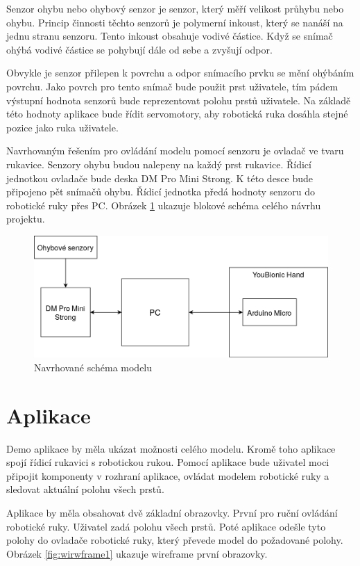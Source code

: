 \documentclass[thesis=B,czech]{FITthesis}[2012/06/26]
\begin{document}
Senzor ohybu nebo ohybový senzor je senzor, který měří velikost průhybu nebo ohybu. Princip činnosti těchto senzorů je polymerní inkoust, který se nanáší na jednu stranu senzoru. Tento inkoust obsahuje vodivé částice. Když se snímač ohýbá vodivé částice se pohybují dále od sebe a zvyšují odpor\cite{flexSens}. 

Obvykle je senzor přilepen k povrchu a odpor snímacího prvku se mění ohýbáním povrchu. Jako povrch pro tento snímač bude použit prst uživatele, tím pádem výstupní hodnota senzorů bude reprezentovat polohu prstů uživatele. Na základě této hodnoty aplikace bude řídit servomotory, aby robotická ruka dosáhla stejné pozice jako ruka uživatele. 


Navrhovaným řešením pro ovládání modelu pomocí senzoru je ovladač ve tvaru rukavice. Senzory ohybu budou nalepeny na každý prst rukavice. Řídicí jednotkou ovladače bude deska DM Pro Mini Strong. K této desce bude připojeno pět snímačů ohybu. Řídicí jednotka předá hodnoty senzoru do robotické ruky přes PC. Obrázek \ref{fig:gloveBlock} ukazuje blokové schéma celého návrhu projektu.

 \begin{figure}[H]
\centering
\includegraphics[scale=0.35]{./image/gloveBlock.png}
\caption{Navrhované schéma modelu}
\label{fig:gloveBlock}
\end{figure}

\section{Aplikace}

Demo aplikace by měla ukázat možnosti celého modelu. Kromě toho aplikace spojí řídicí rukavici s robotickou rukou. Pomocí aplikace bude uživatel moci připojit komponenty v rozhraní aplikace, ovládat modelem robotické ruky a sledovat aktuální polohu všech prstů. 


Aplikace by měla obsahovat dvě základní obrazovky. První pro ruční ovládání robotické ruky. Uživatel zadá polohu všech prstů. Poté aplikace odešle tyto polohy do ovladače robotické ruky, který převede model do požadované polohy. Obrázek \ref{fig:wirwframe1} ukazuje wireframe první obrazovky.
\end{document}
